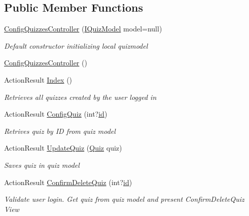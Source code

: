 \subsection*{Public Member Functions}
\begin{DoxyCompactItemize}
\item 
\hyperlink{class_website_1_1_controllers_1_1_config_quizzes_controller_a4c887ae9d12800436a571a58218a2e39}{Config\+Quizzes\+Controller} (\hyperlink{interface_website_1_1_controllers_1_1_i_quiz_model}{I\+Quiz\+Model} model=null)
\begin{DoxyCompactList}\small\item\em Default constructor initializing local quizmodel \end{DoxyCompactList}\item 
\hyperlink{class_website_1_1_controllers_1_1_config_quizzes_controller_a17d716c7fd5697f47c6b3c23a523797d}{Config\+Quizzes\+Controller} ()
\item 
Action\+Result \hyperlink{class_website_1_1_controllers_1_1_config_quizzes_controller_a6abb226f2d23960edce40ca08d9df013}{Index} ()
\begin{DoxyCompactList}\small\item\em Retrieves all quizzes created by the user logged in \end{DoxyCompactList}\item 
Action\+Result \hyperlink{class_website_1_1_controllers_1_1_config_quizzes_controller_a69b93d9f1d3e5848b9d47e29e9958d5d}{Config\+Quiz} (int?\hyperlink{_facebook_8js_a9b3d01084d4285e8b0289ee3f959999b}{id})
\begin{DoxyCompactList}\small\item\em Retrives quiz by I\+D from quiz model \end{DoxyCompactList}\item 
Action\+Result \hyperlink{class_website_1_1_controllers_1_1_config_quizzes_controller_a587a4c1857e43211cad38f2b1ec59b9a}{Update\+Quiz} (\hyperlink{class_website_1_1_models_1_1_quiz}{Quiz} quiz)
\begin{DoxyCompactList}\small\item\em Saves quiz in quiz model \end{DoxyCompactList}\item 
Action\+Result \hyperlink{class_website_1_1_controllers_1_1_config_quizzes_controller_af954aa7794ca62bd640354718700e466}{Confirm\+Delete\+Quiz} (int?\hyperlink{_facebook_8js_a9b3d01084d4285e8b0289ee3f959999b}{id})
\begin{DoxyCompactList}\small\item\em Validate user login. Get quiz from quiz model and present Confirm\+Delete\+Quiz View \end{DoxyCompactList}\item 

\end{DoxyCompactItemize}
